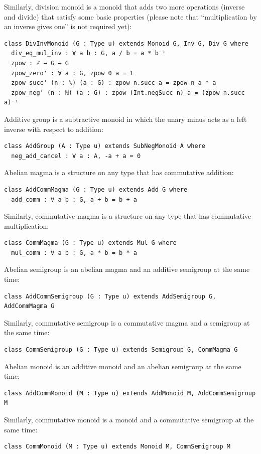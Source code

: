 \documentclass[]{article}
\renewcommand{\.}{\hskip .75pt}
\begin{document}
Similarly, division monoid is a monoid that adds two more operations (inverse and divide)
that satisfy some basic properties (please note that ``multiplication by an inverse gives one''
is not required yet):
\begin{lstlisting}
class DivInvMonoid (G : Type u) extends Monoid G, Inv G, Div G where
  div_eq_mul_inv : ∀ a b : G, a / b = a * b⁻¹ 
  zpow : ℤ → G → G
  zpow_zero' : ∀ a : G, zpow 0 a = 1 
  zpow_succ' (n : ℕ) (a : G) : zpow n.succ a = zpow n a * a
  zpow_neg' (n : ℕ) (a : G) : zpow (Int.negSucc n) a = (zpow n.succ a)⁻¹ 
\end{lstlisting}
Additive group is a subtractive monoid in which the unary minus acts as a left inverse with respect to addition:
\begin{lstlisting}
class AddGroup (A : Type u) extends SubNegMonoid A where
  neg_add_cancel : ∀ a : A, -a + a = 0
\end{lstlisting}
Abelian magma is a structure on any type that has commutative addition:
\begin{lstlisting}
class AddCommMagma (G : Type u) extends Add G where
  add_comm : ∀ a b : G, a + b = b + a
\end{lstlisting}
Similarly, commutative magma is a structure on any type that has commutative multiplication:
\begin{lstlisting}
class CommMagma (G : Type u) extends Mul G where
  mul_comm : ∀ a b : G, a * b = b * a
\end{lstlisting}
Abelian semigroup is an abelian magma and an additive semigroup at the same time:
\begin{lstlisting}
class AddCommSemigroup (G : Type u) extends AddSemigroup G, AddCommMagma G
\end{lstlisting}
Similarly, commutative semigroup is a commutative magma and a semigroup at the same time:
\begin{lstlisting}
class CommSemigroup (G : Type u) extends Semigroup G, CommMagma G
\end{lstlisting} \pagebreak[2]
Abelian monoid is an additive monoid and an abelian semigroup at the same time:
\begin{lstlisting}
class AddCommMonoid (M : Type u) extends AddMonoid M, AddCommSemigroup M
\end{lstlisting}
Similarly, commutative monoid is a monoid and a commutative semigroup at the same time:
\begin{lstlisting}
class CommMonoid (M : Type u) extends Monoid M, CommSemigroup M
\end{lstlisting}
\end{document}
